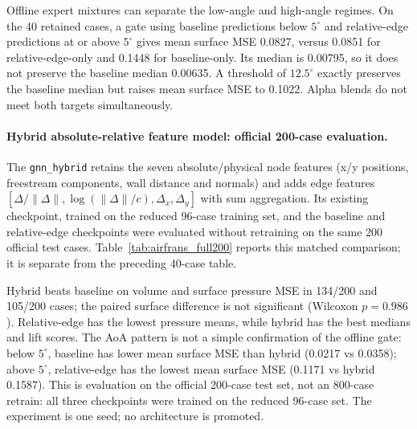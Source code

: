 \documentclass[journal]{IEEEtran}
\begin{document}
Offline expert mixtures can separate the low-angle and high-angle regimes. On
the 40 retained cases, a gate using baseline predictions below $5^\circ$ and
relative-edge predictions at or above $5^\circ$ gives mean surface MSE 0.0827,
versus 0.0851 for relative-edge-only and 0.1448 for baseline-only. Its median
is 0.00795, so it does not preserve the baseline median 0.00635. A threshold of
$12.5^\circ$ exactly preserves the baseline median but raises mean surface MSE
to 0.1022. Alpha blends do not meet both targets simultaneously.
\paragraph{Hybrid absolute-relative feature model: official 200-case evaluation.}
The \texttt{gnn\_hybrid} retains the seven absolute/physical node features
(x/y positions, freestream components, wall distance and normals) and adds edge
features $[\Delta/\|\Delta\|,\log(\|\Delta\|/c),\Delta_x,\Delta_y]$ with sum
aggregation. Its existing checkpoint, trained on the reduced 96-case training
set, and the baseline and relative-edge checkpoints were evaluated without
retraining on the same 200 official test cases. Table~\ref{tab:airfrans_full200}
reports this matched comparison; it is separate from the preceding 40-case table.

\begin{table}[t]
\centering
\caption{Same saved checkpoints evaluated on all 200 official AirfRANS test cases.}
\label{tab:airfrans_full200}
\end{table}

Hybrid beats baseline on volume and surface pressure MSE in 134/200 and 105/200
cases; the paired surface difference is not significant (Wilcoxon $p=0.986$).
Relative-edge has the lowest pressure means, while hybrid has the best medians
and lift scores. The AoA pattern is not a simple confirmation of the offline gate:
below $5^\circ$, baseline has lower mean surface MSE than hybrid (0.0217 vs
0.0358); above $5^\circ$, relative-edge has the lowest mean surface MSE (0.1171
vs hybrid 0.1587). This is evaluation on the official 200-case test set, not an
800-case retrain: all three checkpoints were trained on the reduced 96-case set.
The experiment is one seed; no architecture is promoted.
\end{document}
